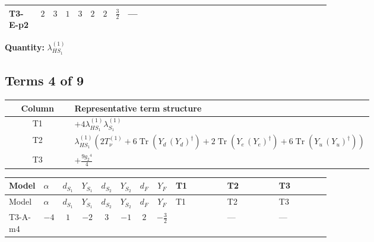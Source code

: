 \documentclass[8pt]{article}
\begin{document}
\begin{landscape}
\begin{longtable}{@{}llcccccc >{\raggedright\arraybackslash}p{0.21\linewidth} >{\raggedright\arraybackslash}p{0.21\linewidth} >{\raggedright\arraybackslash}p{0.21\linewidth}@{}}
\midrule
T3-E-p2 & $2$ & $3$ & $1$ & $3$ & $2$ & $2$ & $\frac{3}{2}$ & --- & \scriptsize\adjustbox{max width=\linewidth}{$\begin{gathered} +6 {\lambda_1} {\lambda_{HS_1}^{(1)}}\end{gathered}$} & \scriptsize\adjustbox{max width=\linewidth}{$\begin{gathered} +4 {\lambda_{HS_1}^{(1)}}^2\end{gathered}$} \\
\midrule
\bottomrule
\end{longtable}
\clearpage
\noindent\textbf{Quantity: }$\lambda_{HS_1}^{(1)}$\par\smallskip
\subsection*{Terms 4 of 9}
\begin{center}
\begin{tabular}{@{}c >{\raggedright\arraybackslash}p{0.82\linewidth}@{}}
\toprule
Column & Representative term structure \\
\midrule
T1 & \(\displaystyle +4 {\lambda_{HS_1}^{(1)}} {\lambda_{S_1}^{(1)}}\) \\
\midrule
T2 & \(\displaystyle {\lambda_{HS_1}^{(1)}} (2 T_{\nu}^{(1)}+6 \operatorname{Tr}\!\left({Y_d}\,\left({Y_d}\right)^{\dagger}\right)+2 \operatorname{Tr}\!\left({Y_e}\,\left({Y_e}\right)^{\dagger}\right)+6 \operatorname{Tr}\!\left({Y_u}\,\left({Y_u}\right)^{\dagger}\right))\) \\
\midrule
T3 & \(\displaystyle +\frac{9 {g_2}^4}{4}\) \\
\midrule
\bottomrule
\end{tabular}
\end{center}
\smallskip
\tiny
\begin{longtable}{@{}llcccccc >{\raggedright\arraybackslash}p{0.21\linewidth} >{\raggedright\arraybackslash}p{0.21\linewidth} >{\raggedright\arraybackslash}p{0.21\linewidth}@{}}
\toprule
Model & $\alpha$ & $d_{S_1}$ & $Y_{S_1}$ & $d_{S_2}$ & $Y_{S_2}$ & $d_F$ & $Y_F$ & T1 & T2 & T3 \\
\midrule
\endfirsthead
\toprule
Model & $\alpha$ & $d_{S_1}$ & $Y_{S_1}$ & $d_{S_2}$ & $Y_{S_2}$ & $d_F$ & $Y_F$ & T1 & T2 & T3 \\
\midrule
\endhead
T3-A-m4 & $-4$ & $1$ & $-2$ & $3$ & $-1$ & $2$ & $-\frac{3}{2}$ & \scriptsize\adjustbox{max width=\linewidth}{$\begin{gathered} +4 {\lambda_{HS_1}^{(1)}} {\lambda_{S_1}^{(1)}}\end{gathered}$} & --- & --- \\

\end{longtable}
\end{landscape}
\end{document}
